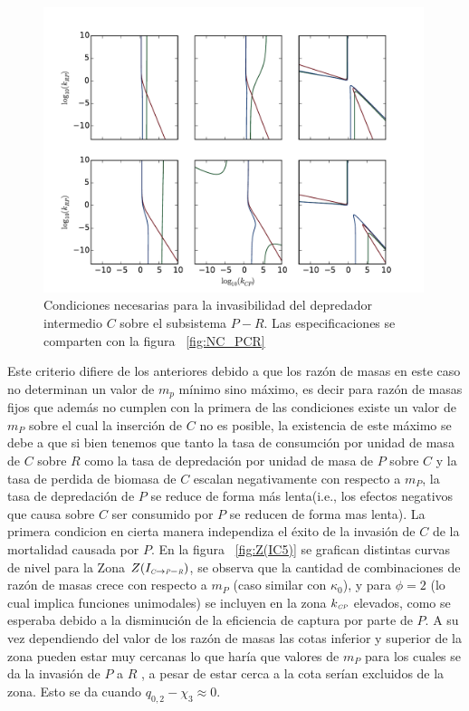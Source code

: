 \begin{figure}
  \centering
  \includegraphics[width = 0.99\textwidth]{./Plots/NecessityCPR.pdf}
  \caption[Condiciones Necesarias $C \to P-R$]{Condiciones necesarias para la invasibilidad del depredador intermedio $C$ sobre el subsistema $P-R$. Las especificaciones se comparten con la figura ~\ref{fig:NC_PCR}}
  \label{fig:NC_CPR}
\end{figure}


Este criterio difiere de los anteriores debido a que los raz\'on de masas en este caso no determinan un valor de $m_p$ m\'inimo sino m\'aximo, es decir para raz\'on de masas fijos que adem\'as no cumplen con la primera de las condiciones existe un valor de $m_P$ sobre el cual la inserci\'on de $C$ no es posible, la existencia de este m\'aximo se debe a que si bien tenemos que tanto la tasa de consumci\'on por unidad de masa de $C$ sobre $R$ como la tasa de depredaci\'on por unidad de masa de $P$ sobre $C$ y la tasa de perdida de biomasa de $C$ escalan negativamente con respecto a $m_P$, la tasa de depredaci\'on de $P$ se reduce de forma m\'as lenta(i.e., los efectos negativos que causa sobre $C$ ser consumido por $P$ se reducen de forma mas lenta). La primera condicion en cierta manera independiza el \'exito de la invasi\'on de $C$ de la mortalidad causada por $P$. En la figura ~\ref{fig:Z(IC5)} se grafican distintas curvas de nivel para la Zona $Z(I_{\textit{\tiny C} \to \textit{\tiny P}-\textit{\tiny R}})$, se observa que la cantidad de combinaciones de raz\'on de masas crece con respecto a $m_P$ (caso similar con $\kappa_0$), y para $\phi = 2$ (lo cual implica funciones unimodales) se incluyen en la zona $k_{\textit{\tiny CP}}$ elevados, como se esperaba debido a la disminuci\'on de la eficiencia de captura por parte de $P$. A su vez dependiendo del valor de los raz\'on de masas las cotas inferior y superior de la zona pueden estar muy cercanas lo que har\'ia que valores de $m_P$ para los cuales se da la invasi\'on de $P$ a $R$ , a pesar de estar cerca a la cota ser\'ian excluidos de la zona. Esto se da cuando $ q_{0,2} - \chi_3 \approx 0$.


